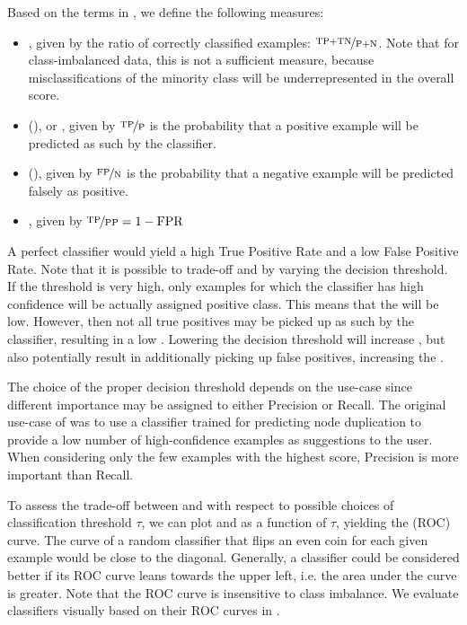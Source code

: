\documentclass[
	fontsize=10pt, %
	twoside=true, %
	secnumdepth=1, %
  toc=indentunnumbered %
]{kaobook}
\begin{document}
Based on the terms in , we define the following measures:
\begin{itemize}
\item {}, given by the ratio of
  correctly classified examples: $\nicefrac{\TP{} + \TN{}}{\P{}+\N{}}$. Note that for
  class-imbalanced data, this is not a sufficient measure, because
  misclassifications of the minority class will be underrepresented in the
  overall score.
\item  {} (\TPR{}), or , given by $\nicefrac{\TP{}}{\P{}}$ is
  the probability that a positive example will be predicted as such by the classifier.
\item {} (\FPR{}), given by $\nicefrac{\FP{}}{\N{}}$ is the
  probability that a negative example will be predicted falsely as positive.
  \item {}, given by $\nicefrac{\TP{}}{\PP{}} = 1 - \FPR{}$
\end{itemize}

A perfect classifier would yield a high True Positive Rate and a low False
Positive Rate.
%
Note that it is possible to trade-off \FPR{} and \TPR{}
by varying the decision threshold. If the threshold is very high, only examples
for which the classifier has high confidence will be actually assigned positive
class. This means that the \FPR{} will be low. However, then not all true
positives may be picked up as such by the classifier, resulting in a low \TPR{}.
Lowering the decision threshold will increase \TPR{}, but also potentially result
in additionally picking up false positives, increasing the \FPR{}.

The choice of the proper decision threshold
depends on the use-case since different importance may be assigned
to either Precision or Recall.
%
The original use-case of \nielsen{} was to use a classifier trained for predicting
node duplication to provide a low number of high-confidence examples as
suggestions to the user. When considering only the few examples with the highest
score, Precision is more important than Recall.

To assess the trade-off between \FPR{} and \TPR{} with respect to possible
choices of classification threshold $\tau$, we can plot \FPR{} and \TPR{} as a
function of $\tau$, yielding the 
\cite{fawcett_IntroductionROCAnalysis_2006} (ROC) curve. The curve of a random
classifier that flips an even coin for each given example would be close to the
diagonal. 
Generally, a classifier could be considered better if its ROC curve leans
towards the upper left, i.e. the area under the curve is greater.
Note that the ROC curve is insensitive to class imbalance. We evaluate
classifiers visually based on their ROC curves in .
\end{document}
